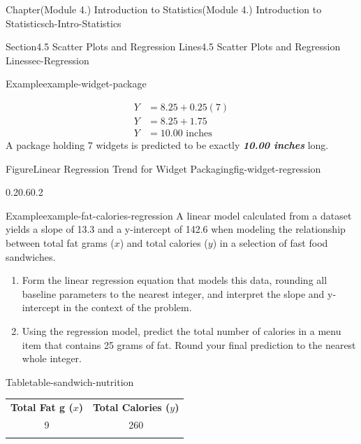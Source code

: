 \documentclass[oneside,10pt,]{book}
\newcommand{\tabularfont}{\relax}
\newcommand{\alert}[1]{\textbf{\textit{#1}}}
\newcommand{\terminology}[1]{\textbf{#1}}
\newcommand{\hrulethin}  {\noalign{\hrule height 0.04em}}
\newcommand{\amp}{&}
\begin{document}
\begin{chapterptx}{Chapter}{(Module 4.) Introduction to Statistics}{}{(Module 4.) Introduction to Statistics}{}{}{ch-Intro-Statistics}
\begin{sectionptx}{Section}{4.5 Scatter Plots and Regression Lines}{}{4.5 Scatter Plots and Regression Lines}{}{}{sec-Regression}
\begin{example}{Example}{}{example-widget-package}
\begin{enumerate}[label={\alph*}]
\begin{align*}
Y \amp= 8.25 + 0.25(7)\\
Y \amp= 8.25 + 1.75\\
Y \amp= 10.00 \text{ inches}
\end{align*}
A package holding 7 widgets is predicted to be exactly \alert{10.00 inches} long.%
\end{enumerate}
%
\begin{figureptx}{Figure}{Linear Regression Trend for Widget Packaging}{fig-widget-regression}{}%
\begin{image}{0.2}{0.6}{0.2}{}%
%
\end{image}%
\tcblower
\end{figureptx}%
\end{example}
\begin{example}{Example}{}{example-fat-calories-regression}%
A linear model calculated from a dataset yields a slope of 13.3 and a y-intercept of 142.6 when modeling the relationship between total fat grams (\(x\)) and total calories (\(y\)) in a selection of fast food sandwiches.%
\par
%
\begin{enumerate}[label={\alph*}]
\item{}Form the linear regression equation that models this data, rounding all baseline parameters to the nearest integer, and interpret the slope and y-intercept in the context of the problem.%
\item{}Using the regression model, predict the total number of calories in a menu item that contains 25 grams of fat. Round your final prediction to the nearest whole integer.%
\end{enumerate}
%
\begin{tableptx}{Table}{\textbf{}}{table-sandwich-nutrition}{}%
\centering%
{\tabularfont%
\begin{tabular}{cc}\hrulethin
{\bfseries{}\terminology{Total Fat g (\(x\))}}&{\bfseries{}\terminology{Total Calories (\(y\))}}\tabularnewline\hrulethin
9&260\tabularnewline\hrulethin

\end{tabular}}
\end{tableptx}
\end{example}
\end{sectionptx}
\end{chapterptx}
\end{document}
